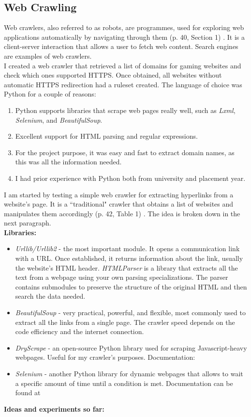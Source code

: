 \documentclass[a4paper, 12pt, titlepage]{article}
\begin{document}
\subsection{Web Crawling}
Web crawlers, also referred to as robots, are programmes, used for exploring web applications automatically by navigating through them (p. 40, Section 1) \cite{WCHistory}. It is a client-server interaction that allows a user to fetch web content. Search engines are examples of web crawlers.\\[6pt]
I created a web crawler that retrieved a list of domains for gaming websites and check which ones supported HTTPS. Once obtained, all websites without automatic HTTPS redirection had a ruleset created. The language of choice was Python for a couple of reasons:

\begin{enumerate}
\item{Python supports libraries that scrape web pages really well, such as \textit{Lxml}, \textit{Selenium}, and \textit{BeautifulSoup}.}
\item{Excellent support for HTML parsing and regular expressions.}
\item{For the project purpose, it was easy and fast to extract domain names, as this was all the information needed.}
\item{I had prior experience with Python both from university and placement year.}
\end{enumerate}
I am started by testing a simple web crawler for extracting hyperlinks from a website's page. It is a ``traditional" crawler that obtains a list of websites and manipulates them accordingly (p. 42, Table 1) \cite{WCHistory}. The idea is broken down in the next paragraph. \\[6pt]
\textbf{Libraries:}

\begin{itemize}
\item{\textit{Urllib/Urllib2} - the most important module. It opens a communication link with a URL. Once established, it returns information about the link, usually the website's HTML header. \textit{HTMLParser} is a library that extracts all the text from a webpage using your own parsing specializations. The parser contains submodules to preserve the structure of the original HTML and then search the data needed.}
\item{\textit{BeautifulSoup} - very practical, powerful, and flexible, most commonly used to extract all the links from a single page. The crawler speed depends on the code efficiency and the internet connection.}
\item{\textit{DryScrape} - an open-source Python library used for scraping Javascript-heavy webpages. Useful for my crawler's purposes. Documentation: \cite{DryScrape}}
\item{\textit{Selenium} - another Python library for dynamic webpages that allows to wait a specific amount of time until a condition is met. Documentation can be found at \cite{Selenium}}
\end{itemize}
\textbf{Ideas and experiments so far:}
\end{document}
